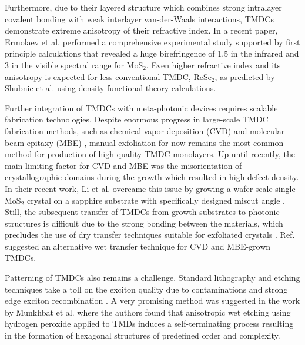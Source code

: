 \documentclass[journal=chreay,manuscript=review]{achemso}
\begin{document}
Furthermore, due to their layered structure which combines strong intralayer covalent bonding with weak interlayer van-der-Waals interactions, TMDCs demonstrate extreme anisotropy of their refractive index. In a recent paper, Ermolaev et al. \cite{Ermolaev2021} performed a comprehensive experimental study supported by first principle calculations that revealed a huge birefringence of 1.5 in the infrared and 3 in the visible spectral range for MoS$_2$. Even higher refractive index and its anisotropy is expected for less conventional TMDC, ReSe$_2$, as predicted by Shubnic et al. using density functional theory calculations\cite{shubnic2020high}. 

Further integration of TMDCs with meta-photonic devices requires scalable fabrication technologies. Despite enormous progress in large-scale TMDC fabrication methods, such as chemical vapor deposition (CVD) \cite{shree2019high} and molecular beam epitaxy (MBE) \cite{fu2017molecular}, manual exfoliation for now remains the most common method for production of high quality TMDC monolayers. Up until recently, the main limiting factor for CVD and MBE was the misorientation of crystallographic domains during the growth which resulted in high defect density. In their recent work, Li et al. overcame this issue by growing a wafer-scale single MoS$_2$ crystal on a sapphire substrate with specifically designed miscut angle \cite{li2021epitaxial}. Still, the subsequent transfer of TMDCs from growth substrates to photonic structures is difficult due to the strong bonding between the materials, which precludes the use of dry transfer techniques suitable for exfoliated crystals \cite{castellanos2014deterministic}. Ref.~ suggested an alternative wet transfer technique for CVD and  MBE-grown TMDCs.

Patterning of TMDCs also remains a challenge. Standard lithography and etching techniques take a toll on the exciton quality due to contaminations and strong edge exciton recombination \cite{lochner2019controlling}. A very promising method was suggested in the work by Munkhbat et al. \cite{munkhbat2020transition} where the authors found that anisotropic wet etching using hydrogen peroxide applied to TMDs induces a self-terminating process resulting in the formation of hexagonal structures of predefined order and complexity.
\end{document}
